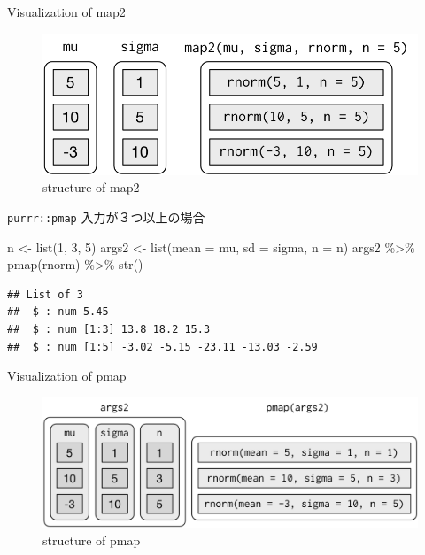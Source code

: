 \documentclass[
  ignorenonframetext,
  aspectratio=169]{beamer}
\newenvironment{Shaded}{\begin{snugshade}}{\end{snugshade}}
\newcommand{\AttributeTok}[1]{\textcolor[rgb]{0.77,0.63,0.00}{#1}}
\newcommand{\DecValTok}[1]{\textcolor[rgb]{0.00,0.00,0.81}{#1}}
\newcommand{\FunctionTok}[1]{\textcolor[rgb]{0.00,0.00,0.00}{#1}}
\newcommand{\NormalTok}[1]{#1}
\newcommand{\OtherTok}[1]{\textcolor[rgb]{0.56,0.35,0.01}{#1}}
\newcommand{\SpecialCharTok}[1]{\textcolor[rgb]{0.00,0.00,0.00}{#1}}
\begin{document}
\begin{frame}{Visualization of map2}
\protect\hypertarget{visualization-of-map2}{}
\begin{figure}
\centering
\includegraphics{../img/lists-map2.png}
\caption{structure of map2}
\end{figure}
\end{frame}

\begin{frame}[fragile]{\texttt{purrr::pmap}}
\protect\hypertarget{purrrpmap}{}
入力が３つ以上の場合

\begin{Shaded}
\begin{Highlighting}[]
\NormalTok{n }\OtherTok{\textless{}{-}} \FunctionTok{list}\NormalTok{(}\DecValTok{1}\NormalTok{, }\DecValTok{3}\NormalTok{, }\DecValTok{5}\NormalTok{)}
\NormalTok{args2 }\OtherTok{\textless{}{-}} \FunctionTok{list}\NormalTok{(}\AttributeTok{mean =}\NormalTok{ mu, }\AttributeTok{sd =}\NormalTok{ sigma, }\AttributeTok{n =}\NormalTok{ n)}
\NormalTok{args2 }\SpecialCharTok{\%\textgreater{}\%} \FunctionTok{pmap}\NormalTok{(rnorm) }\SpecialCharTok{\%\textgreater{}\%} \FunctionTok{str}\NormalTok{()}
\end{Highlighting}
\end{Shaded}

\begin{verbatim}
## List of 3
##  $ : num 5.45
##  $ : num [1:3] 13.8 18.2 15.3
##  $ : num [1:5] -3.02 -5.15 -23.11 -13.03 -2.59
\end{verbatim}
\end{frame}

\begin{frame}{Visualization of pmap}
\protect\hypertarget{visualization-of-pmap}{}
\begin{figure}
\centering
\includegraphics{../img/lists-pmap-named.png}
\caption{structure of pmap}
\end{figure}
\end{frame}
\end{document}
